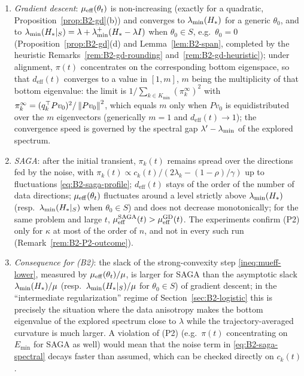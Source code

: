 \begin{enumerate}[label=(P\arabic*)]
\item \emph{Gradient descent}: $\mu_{\mathrm{eff}}(\theta_t)$ is non-increasing (exactly for a quadratic,
Proposition~\ref{prop:B2-gd}(b)) and converges to $\lambda_{\min}(H_\ast)$ for a generic $\theta_0$, and to
$\lambda_{\min}(H_\ast|_S)=\lambda+\lambda^+_{\min}(H_\ast-\lambda I)$ when $\theta_0\in S$, e.g.\ $\theta_0=0$
(Proposition~\ref{prop:B2-gd}(d) and Lemma~\ref{lem:B2-span}, completed by the heuristic
Remarks~\ref{rem:B2-gd-rounding} and~\ref{rem:B2-gd-heuristic}); under alignment,
$\pi(t)$ concentrates on the corresponding bottom eigenspace, so that $d_{\mathrm{eff}}(t)$ converges to a value in
$[1,m]$, $m$ being the multiplicity of that bottom eigenvalue: the limit is $1/\sum_{k\in K_{\min}}(\pi_k^\infty)^2$ with
$\pi_k^\infty=(q_k^\top Pv_0)^2/\left\|Pv_0\right\|^2$, which equals $m$ only when $Pv_0$ is equidistributed over the $m$
eigenvectors (generically $m=1$ and $d_{\mathrm{eff}}(t)\to1$); the convergence speed is governed by the spectral gap
$\lambda'-\lambda_{\min}$ of the explored spectrum.
\item \emph{SAGA}: after the initial transient, $\pi_k(t)$ remains spread over the directions fed by the
noise, with $\pi_k(t)\propto c_k(t)/(2\lambda_k-(1-\rho)/\gamma)$ up to fluctuations \eqref{eq:B2-saga-profile};
$d_{\mathrm{eff}}(t)$ stays of the order of the number of data directions; $\mu_{\mathrm{eff}}(\theta_t)$ fluctuates
around a level strictly above $\lambda_{\min}(H_\ast)$ (resp.\ $\lambda_{\min}(H_\ast|_S)$ when $\theta_0\in S$) and does not decrease
monotonically; for the same problem and
large $t$, $\mu_{\mathrm{eff}}^{\mathrm{SAGA}}(t)>\mu_{\mathrm{eff}}^{\mathrm{GD}}(t)$. The experiments confirm (P2) only for $\kappa$ at most of the
order of $n$, and not in every such run (Remark~\ref{rem:B2-P2-outcome}).
\item \emph{Consequence for (B2)}: the slack of the strong-convexity step \eqref{ineq:mueff-lower}, measured by
$\mu_{\mathrm{eff}}(\theta_t)/\mu$, is larger for SAGA than the asymptotic slack $\lambda_{\min}(H_\ast)/\mu$ (resp.\
$\lambda_{\min}(H_\ast|_S)/\mu$ for $\theta_0\in S$) of gradient descent; in the ``intermediate regularization'' regime of
Section~\ref{sec:B2-logistic} this is precisely the situation where the data anisotropy makes the bottom eigenvalue of
the explored spectrum close to $\lambda$ while the trajectory-averaged curvature is much larger. A violation of (P2) (e.g.\ $\pi(t)$ concentrating on $E_{\min}$ for SAGA as well) would mean that
the noise term in \eqref{eq:B2-saga-spectral} decays faster than assumed, which can be checked directly on
$c_k(t)$.
\end{enumerate}


